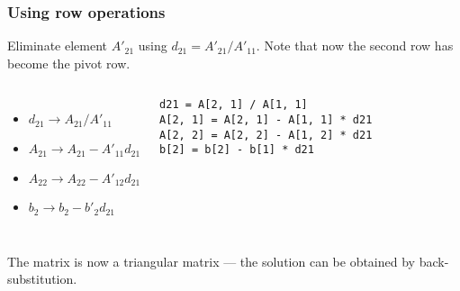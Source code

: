 \begin{frame}[fragile]
  \frametitle{Using row operations}
  Eliminate element $A'_{21}$ using $d_{21}=A'_{21}/A'_{11}$. Note that now the second row has become the pivot row.
  \vfill
  \vfill\pause
  \begin{columns}
  \begin{itemize}
    \item $d_{21}\rightarrow A_{21}/A'_{11}$
    \item $A_{21}\rightarrow A_{21}-A'_{11}d_{21}$
    \item $A_{22}\rightarrow A_{22}-A'_{12}d_{21}$
    \item $b_2   \rightarrow b_2   -b'_2   d_{21}$
  \end{itemize}
   \begin{lstlisting}
d21 = A[2, 1] / A[1, 1]
A[2, 1] = A[2, 1] - A[1, 1] * d21
A[2, 2] = A[2, 2] - A[1, 2] * d21
b[2] = b[2] - b[1] * d21
   \end{lstlisting}
  \end{columns}
  \pause
  \vfill
  The matrix is now a triangular matrix --- the solution can be obtained by back-substitution.
\end{frame}

